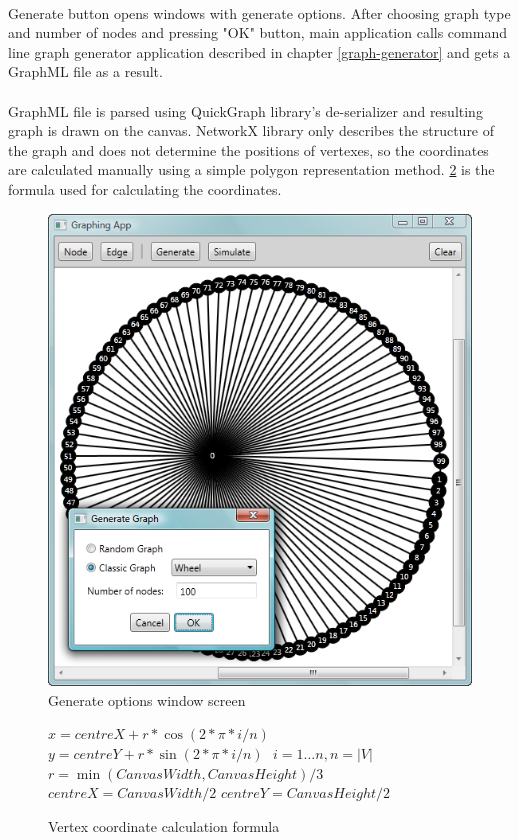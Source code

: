 \documentclass[a4paper,TexShade]{class}
\begin{document}
\paragraph{} Generate button opens windows with generate options. After choosing graph type and number of nodes and pressing "OK" button, main application calls command line graph generator application described in chapter \ref{graph-generator} and gets a GraphML file as a result. 

\paragraph{} GraphML file is parsed using QuickGraph \cite{quick-graph} library's de-serializer and resulting graph is drawn on the canvas. NetworkX library only describes the structure of the graph and does not determine the positions of vertexes, so the coordinates are calculated manually using a simple polygon representation method. \ref{fig:formula} is the formula used for calculating the coordinates.

\bigskip
\begin{figure}[h]
\centering
\caption{Generate options window screen} \label{fig:main2}
\includegraphics[width=0.8\linewidth ,natwidth=532,natheight=593]{images/main2.png}
\end{figure}


\begin{figure}[h]
\centering
\caption{Vertex coordinate calculation formula} \label{fig:formula}
$
x = centreX + r * \cos(2 * \pi * i / n)
$ \linebreak $
y =  centreY + r * \sin(2 * \pi * i / n)
$ \linebreak $
$ \linebreak $
i = 1\ldots n, n = |V|
$ \linebreak $
r = \min(CanvasWidth, CanvasHeight) / 3
$ \linebreak $
centreX = CanvasWidth / 2
$ \linebreak $
centreY = CanvasHeight / 2
$
\end{figure}
\end{document}
